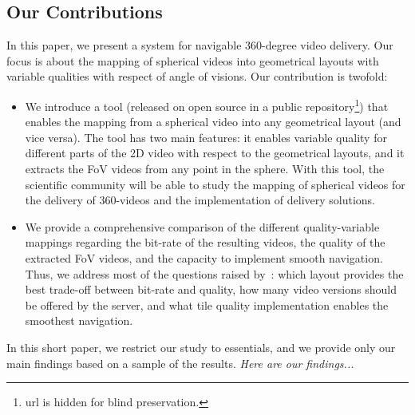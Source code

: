 \subsection{Our Contributions}

In this paper, we present a system for navigable 360-degree video delivery. Our focus is
about the mapping of spherical videos into geometrical layouts with variable qualities
with respect of angle of visions. Our contribution is twofold:
\begin{itemize}
\item We introduce a tool (released on open source in a public repository\footnote{url is hidden for blind
preservation.}) that enables the mapping from a spherical video
into any geometrical layout (and vice versa). The tool has two main features: it enables variable
quality for different parts of the 2D video with respect to the geometrical layouts, and it extracts the 
\ac{FoV} videos from any point in the sphere. With this tool, the scientific community will be able to 
study the mapping of spherical videos for the delivery of 360-videos and the implementation of delivery 
solutions.
\item We provide a comprehensive comparison of the different quality-variable 
mappings regarding
the bit-rate of the resulting videos, the quality of the extracted \ac{FoV} videos, and the capacity to
implement smooth navigation. Thus, we address most of
the questions raised by~\citet{facebook}: which layout provides the best trade-off between bit-rate and
quality, how many video versions should be offered by the server, and what tile quality implementation 
enables the smoothest navigation.
\end{itemize}

In this short paper, we restrict our study to essentials, and we provide only our main findings based on a 
sample of the results. \textit{Here are our findings...}




